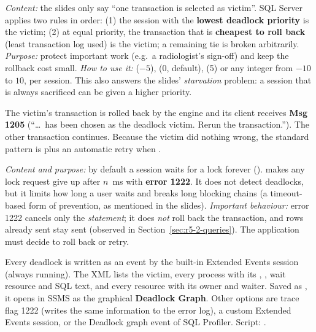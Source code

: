 \emph{Content:} the slides only say ``one transaction is selected as victim''. SQL Server applies two rules in order: (1) the session with the \textbf{lowest deadlock priority} is the victim; (2) at equal priority, the transaction that is \textbf{cheapest to roll back} (least transaction log used) is the victim; a remaining tie is broken arbitrarily. \emph{Purpose:} protect important work (e.g.\ a radiologist's sign-off) and keep the rollback cost small. \emph{How to use it:}  ($-5$),  (0, default),  (5) or any integer from $-10$ to $10$, per session. This also answers the slides' \emph{starvation} problem: a session that is always sacrificed can be given a higher priority.

The victim's transaction is rolled back by the engine and its client receives \textbf{Msg 1205} (``\dots\ has been chosen as the deadlock victim. Rerun the transaction.''). The other transaction continues. Because the victim did nothing wrong, the standard pattern is  plus an automatic retry when .

\emph{Content and purpose:} by default a session waits for a lock forever ().  makes any lock request give up after $n$~ms with \textbf{error 1222}. It does not detect deadlocks, but it limits how long a user waits and breaks long blocking chains (a timeout-based form of prevention, as mentioned in the slides). \emph{Important behaviour:} error 1222 cancels only the \emph{statement}; it does \emph{not} roll back the transaction, and rows already sent stay sent (observed in Section~\ref{sec:r5-2-queries}). The application must decide to roll back or retry.

Every deadlock is written as an  event by the built-in Extended Events session \textbf{} (always running). The XML lists the victim, every process with its , , wait resource and SQL text, and every resource with its owner and waiter. Saved as , it opens in SSMS as the graphical \textbf{Deadlock Graph}. Other options are trace flag 1222 (writes the same information to the error log), a custom Extended Events session, or the Deadlock graph event of SQL Profiler. Script: .

